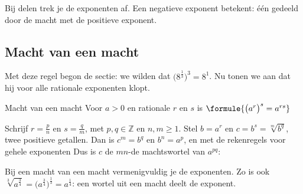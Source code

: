Bij delen trek je de exponenten af. Een negatieve exponent betekent: één gedeeld door de macht met de positieve exponent.


\begin{oefeningen}
\end{oefeningen}

\subsection{Macht van een macht}

Met deze regel begon de sectie: we wilden dat $\bigl(8^{\frac13}\bigr)^3 = 8^1$. Nu tonen we aan dat hij voor alle rationale exponenten klopt.

\begin{theorie}
\begin{stelling}{Macht van een macht}
Voor $a > 0$ en rationale $r$ en $s$ is \qquad $\formule{\bigl(a^r\bigr)^s = a^{rs}}$
\end{stelling}
\begin{bewijs}
Schrijf $r = \frac{p}{n}$ en $s = \frac{q}{m}$, met $p, q \in \mathbb{Z}$ en $n, m \geqslant 1$. Stel $b = a^r$ en $c = b^s = \sqrt[m]{b^q}$, twee positieve getallen. Dan is $c^m = b^q$ en $b^n = a^p$, en met de rekenregels voor gehele exponenten
Dus is $c$ de $mn$-de machtswortel van $a^{pq}$:
\end{bewijs}
\end{theorie}

Bij een macht van een macht vermenigvuldig je de exponenten. Zo is ook $\sqrt[3]{a^{\frac34}} = \bigl(a^{\frac34}\bigr)^{\frac13} = a^{\frac14}$: een wortel uit een macht deelt de exponent.



